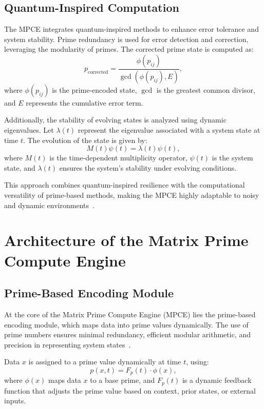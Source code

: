 \documentclass{article}
\theoremstyle{plain}
\begin{document}
\subsection{Quantum-Inspired Computation}

The MPCE integrates quantum-inspired methods to enhance error tolerance and system stability. Prime redundancy is used for error detection and correction, leveraging the modularity of primes. The corrected prime state is computed as:
\begin{equation}
    p_{\text{corrected}} = \frac{\phi(p_{ij})}{\gcd(\phi(p_{ij}), E)},
\end{equation}
where \( \phi(p_{ij}) \) is the prime-encoded state, \( \gcd \) is the greatest common divisor, and \( E \) represents the cumulative error term.

Additionally, the stability of evolving states is analyzed using dynamic eigenvalues. Let \( \lambda(t) \) represent the eigenvalue associated with a system state at time \( t \). The evolution of the state is given by:
\begin{equation}
    M(t) \psi(t) = \lambda(t) \psi(t),
\end{equation}
where \( M(t) \) is the time-dependent multiplicity operator, \( \psi(t) \) is the system state, and \( \lambda(t) \) ensures the system's stability under evolving conditions.

This approach combines quantum-inspired resilience with the computational versatility of prime-based methods, making the MPCE highly adaptable to noisy and dynamic environments~\cite{haroche2013nobel, wang2021quantum}.

\section{Architecture of the Matrix Prime Compute Engine}

\subsection{Prime-Based Encoding Module}

At the core of the Matrix Prime Compute Engine (MPCE) lies the prime-based encoding module, which maps data into prime values dynamically. The use of prime numbers ensures minimal redundancy, efficient modular arithmetic, and precision in representing system states~\cite{hardy2008introduction, riemann1859hypothesis}.

Data \( x \) is assigned to a prime value dynamically at time \( t \), using:
\begin{equation}
    p(x, t) = F_p(t) \cdot \phi(x),
\end{equation}
where \( \phi(x) \) maps data \( x \) to a base prime, and \( F_p(t) \) is a dynamic feedback function that adjusts the prime value based on context, prior states, or external inputs.
\end{document}
